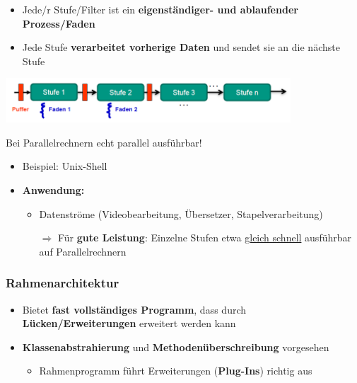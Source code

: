 \documentclass[parskip=full, 12pt]{scrartcl}
\begin{document}
				\begin{itemize}
					\item Jede/r Stufe/Filter ist ein \textbf{eigenständiger- und ablaufender Prozess/Faden}
					\item Jede Stufe \textbf{verarbeitet vorherige Daten} und sendet sie an die nächste Stufe
				\end{itemize}
	
				\begin{center}
					\includegraphics[width=0.8\textwidth]{../images/fliessband.png}
					
					Bei Parallelrechnern echt parallel ausführbar!
				\end{center}
	
				\begin{itemize}
					\item Beispiel: Unix-Shell
					\item \textbf{Anwendung:}
					\begin{itemize}
						\item Datenströme (Videobearbeitung, Übersetzer, Stapelverarbeitung)
						
						$\Rightarrow$ Für \textbf{gute Leistung}: Einzelne Stufen etwa \underline{gleich schnell} ausführbar auf Parallelrechnern
					\end{itemize}
				\end{itemize}
	
			\subsubsection{Rahmenarchitektur}
			
				\begin{itemize}
					\item Bietet \textbf{fast vollständiges Programm}, dass durch \textbf{Lücken/Erweiterungen} erweitert werden kann
					\item \textbf{Klassenabstrahierung} und \textbf{Methodenüberschreibung} vorgesehen
					\begin{itemize}
						\item Rahmenprogramm führt Erweiterungen (\textbf{Plug-Ins}) richtig aus
					\end{itemize}
				\end{itemize}
			
\end{document}
